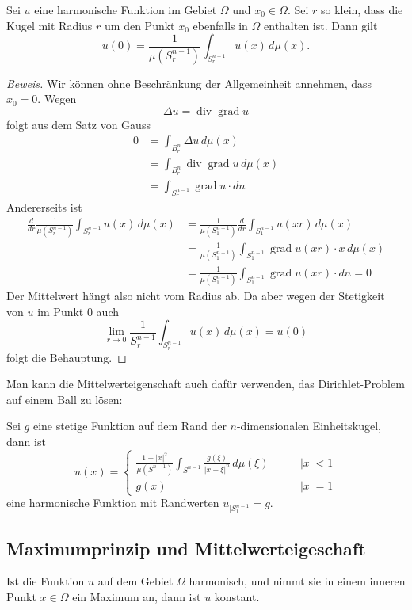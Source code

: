 \begin{satz}[Mittelwerteigenschaft]
Sei $u$ eine harmonische Funktion im Gebiet $\Omega$ und $x_0\in\Omega$.
Sei $r$ so klein, dass die Kugel mit Radius $r$ um den Punkt $x_0$
ebenfalls in $\Omega$ enthalten ist. Dann gilt
\[
u(0)=\frac1{\mu(S^{n-1}_r)}\int_{S^{n-1}_r}u(x)\,d\mu(x).
\]
\end{satz}
\begin{proof}[Beweis]
Wir können ohne Beschränkung der Allgemeinheit annehmen, dass $x_0=0$.
Wegen 
\[
\Delta u=\operatorname{div}\operatorname{grad}u
\]
folgt aus dem Satz von Gauss
\begin{align*}
0&=\int_{B_r^n}\Delta u\,d\mu(x)
\\
&=\int_{B_r^n}\operatorname{div}\operatorname{grad}u\,d\mu(x)
\\
&=\int_{S_r^{n-1}} \operatorname{grad}u\cdot dn
\end{align*}
Andererseits ist 
\begin{align*}
\frac{d}{dr}\frac{1}{\mu(S_r^{n-1})}\int_{S_r^{n-1}} u(x)\,d\mu(x)
&=
\frac1{\mu(S_1^{n-1})}\frac{d}{dr}\int_{S_1^{n-1}}u(xr)\,d\mu(x)
\\
&=
\frac1{\mu(S_1^{n-1})}\int_{S_1^{n-1}}\operatorname{grad}u(xr)\cdot x
\,d\mu(x)
\\
&=
\frac1{\mu(S_1^{n-1})}\int_{S_1^{n-1}}\operatorname{grad}u(xr)\cdot dn=0
\end{align*}
Der Mittelwert hängt also nicht vom Radius ab. Da aber wegen
der Stetigkeit von $u$ im Punkt $0$ auch
\[
\lim_{r\to 0}\frac1{S_r^{n-1}}\int_{S_r^{n-1}}u(x)\,d\mu(x)=u(0)
\]
folgt die Behauptung.
\end{proof}

Man kann die Mittelwerteigenschaft auch dafür verwenden, das Dirichlet-Problem
auf einem Ball zu lösen:

\begin{satz}
Sei $g$ eine stetige Funktion auf dem Rand der $n$-dimensio\-nalen
Einheitskugel, dann ist
\[
u(x)=\begin{cases}
\displaystyle \frac{1-|x|^2}{\mu(S^{n-1})}
\int_{S^{n-1}}\frac{g(\xi)}{|x-\xi|^n}\,d\mu(\xi)&\qquad |x|<1\\
g(x)&\qquad |x|=1
\end{cases}
\]
eine harmonische Funktion mit Randwerten $u_{|S_1^{n-1}}=g$.
\end{satz}

\subsection{Maximumprinzip und Mittelwerteigeschaft}
\begin{satz}[Maximumprinzip]Ist die Funktion $u$ auf dem Gebiet
$\Omega$ harmonisch, und nimmt sie in einem inneren Punkt $x\in\Omega$
ein Maximum an, dann ist $u$ konstant.
\end{satz}

